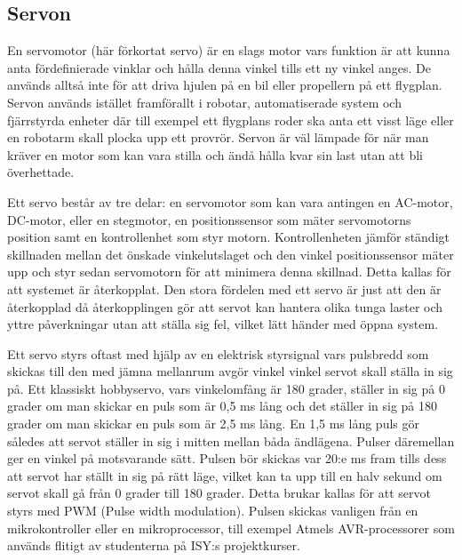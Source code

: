 \documentclass[a4paper,12pt]{article}
\begin{document}
\subsection{Servon}
 
En servomotor (här förkortat servo) är en slags motor vars funktion är att kunna anta fördefinierade  vinklar och hålla denna vinkel tills ett ny vinkel anges. De används alltså inte för att driva hjulen på en bil eller propellern på ett flygplan. Servon används istället framförallt i robotar, automatiserade system  och fjärrstyrda enheter där till exempel ett flygplans roder ska anta ett visst läge eller en robotarm skall plocka upp ett provrör. Servon är väl lämpade för när man kräver en motor som kan vara stilla och ändå hålla kvar sin last utan att bli överhettade. 
 
Ett servo består av tre delar: en servomotor som kan vara antingen en AC-motor, DC-motor, eller en stegmotor, en positionssensor som mäter servomotorns position samt en kontrollenhet som styr motorn.  Kontrollenheten jämför ständigt skillnaden mellan det önskade vinkelutslaget och den vinkel positionssensor mäter upp och styr sedan servomotorn för att minimera denna skillnad. Detta kallas för att systemet är återkopplat. Den stora fördelen med ett servo är just att den är återkopplad då återkopplingen gör att servot kan hantera olika tunga laster och yttre påverkningar utan att ställa sig fel, vilket lätt händer med öppna system. 
 
Ett servo styrs oftast  med hjälp av en elektrisk styrsignal vars pulsbredd som skickas till den med jämna mellanrum avgör vinkel vinkel servot skall ställa in sig på. Ett klassiskt hobbyservo, vars vinkelomfång är 180 grader, ställer in sig på 0 grader om man skickar en puls som är 0,5 ms lång och det ställer in sig på 180 grader om man skickar en puls som är 2,5 ms lång. En 1,5 ms lång puls gör således att servot ställer in sig i mitten mellan båda ändlägena. Pulser däremellan ger en vinkel på motsvarande sätt. Pulsen bör skickas var 20:e ms fram tills dess att servot har ställt in sig på rätt läge, vilket kan ta upp till en halv sekund om servot skall gå från 0 grader till 180 grader. Detta brukar kallas för att servot styrs med PWM (Pulse width modulation). Pulsen skickas vanligen från en mikrokontroller eller en mikroprocessor, till exempel Atmels AVR-processorer som används flitigt av studenterna på ISY:s projektkurser.
 
\end{document}
